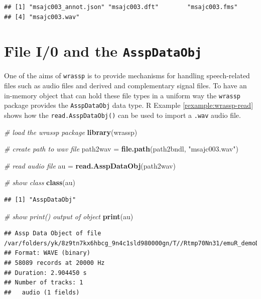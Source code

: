 \documentclass[]{book}
\newenvironment{Shaded}{\begin{snugshade}}{\end{snugshade}}
\newcommand{\CommentTok}[1]{\textcolor[rgb]{0.56,0.35,0.01}{\textit{#1}}}
\newcommand{\KeywordTok}[1]{\textcolor[rgb]{0.13,0.29,0.53}{\textbf{#1}}}
\newcommand{\NormalTok}[1]{#1}
\newcommand{\StringTok}[1]{\textcolor[rgb]{0.31,0.60,0.02}{#1}}
\theoremstyle{definition}
\theoremstyle{definition}
\theoremstyle{definition}
\theoremstyle{remark}
\begin{document}
\begin{verbatim}
## [1] "msajc003_annot.json" "msajc003.dft"        "msajc003.fms"       
## [4] "msajc003.wav"
\end{verbatim}

\hypertarget{file-i0-and-the-asspdataobj}{%
\section{\texorpdfstring{File I/0 and the
\texttt{AsspDataObj}}{File I/0 and the AsspDataObj}}\label{file-i0-and-the-asspdataobj}}

One of the aims of \texttt{wrassp} is to provide mechanisms for handling
speech-related files such as audio files and derived and complementary
signal files. To have an in-memory object that can hold these file types
in a uniform way the \texttt{wrassp} package provides the
\texttt{AsspDataObj} data type. R Example \ref{rexample:wrassp-read}
shows how the \texttt{read.AsspDataObj()} can be used to import a
\texttt{.wav} audio file.

\begin{Shaded}
\begin{Highlighting}[]
\CommentTok{# load the wrassp package}
\KeywordTok{library}\NormalTok{(wrassp)}

\CommentTok{# create path to wav file}
\NormalTok{path2wav =}\StringTok{ }\KeywordTok{file.path}\NormalTok{(path2bndl, }\StringTok{"msajc003.wav"}\NormalTok{)}

\CommentTok{# read audio file}
\NormalTok{au =}\StringTok{ }\KeywordTok{read.AsspDataObj}\NormalTok{(path2wav)}

\CommentTok{# show class}
\KeywordTok{class}\NormalTok{(au)}
\end{Highlighting}
\end{Shaded}

\begin{verbatim}
## [1] "AsspDataObj"
\end{verbatim}

\begin{Shaded}
\begin{Highlighting}[]
\CommentTok{# show print() output of object}
\KeywordTok{print}\NormalTok{(au)}
\end{Highlighting}
\end{Shaded}

\begin{verbatim}
## Assp Data Object of file /var/folders/yk/8z9tn7kx6hbcg_9n4c1sld980000gn/T//Rtmp70Nn31/emuR_demoData/ae_emuDB/0000_ses/msajc003_bndl/msajc003.wav.
## Format: WAVE (binary)
## 58089 records at 20000 Hz
## Duration: 2.904450 s
## Number of tracks: 1 
##   audio (1 fields)
\end{verbatim}
\end{document}
